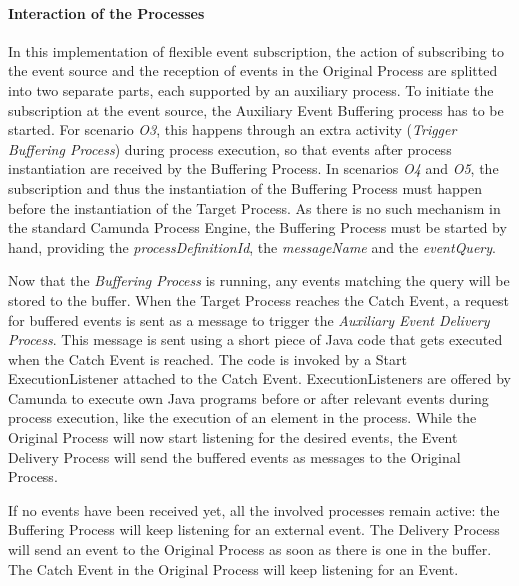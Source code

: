 \paragraph{Interaction of the Processes}
In this implementation of flexible event subscription, the action of subscribing to the event source and the reception of events in the Original Process are splitted into two separate parts, each supported by an auxiliary process.
To initiate the subscription at the event source, the Auxiliary Event Buffering process has to be started.
For scenario \textit{O3}, this happens through an extra activity (\textit{Trigger Buffering Process}) during process execution, so that events after process instantiation are received by the Buffering Process.
In scenarios \textit{O4} and \textit{O5}, the subscription and thus the instantiation of the Buffering Process must happen before the instantiation of the Target Process. As there is no such mechanism in the standard Camunda Process Engine, the Buffering Process must be started by hand, providing the \textit{processDefinitionId}, the \textit{messageName} and the \textit{eventQuery}.

Now that the \textit{Buffering Process} is running, any events matching the query will be stored to the buffer.
When the Target Process reaches the Catch Event, a request for buffered events is sent as a message to trigger the \textit{Auxiliary Event Delivery Process}.
This message is sent using a short piece of Java code that gets executed when the Catch Event is reached. 
The code is invoked by a Start ExecutionListener attached to the Catch Event. ExecutionListeners are offered by Camunda to execute own Java programs before or after relevant events during process execution, like the execution of an element in the process.
While the Original Process will now start listening for the desired events, the Event Delivery Process will send the buffered events as messages to the Original Process.

If no events have been received yet, all the involved processes remain active: the Buffering Process will keep listening for an external event. The Delivery Process will send an event to the Original Process as soon as there is one in the buffer. The Catch Event in the Original Process will keep listening for an Event.



